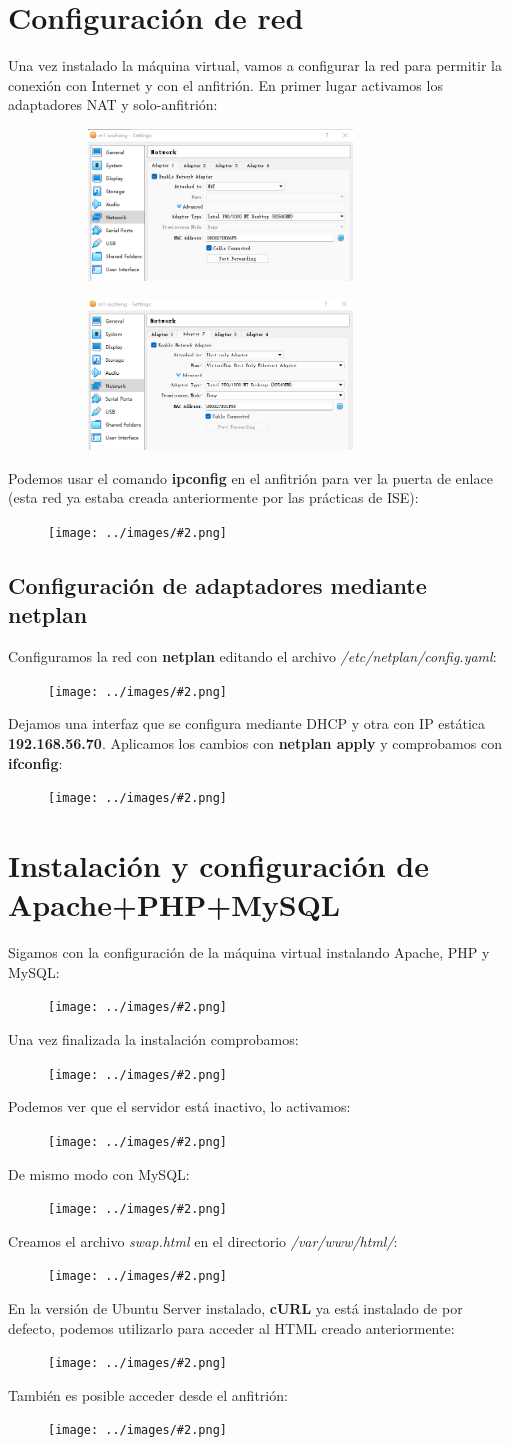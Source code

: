 \documentclass[twoside]{article}
\newcommand{\image}[2]{
\begin{figure}[H]
    \texttt{[image: ../images/\#2.png]}
    \centering
\end{figure}
}
\begin{document}
\section{Configuración de red}
Una vez instalado la máquina virtual, vamos a configurar la red para permitir la conexión con Internet y con el anfitrión. En primer lugar activamos los adaptadores NAT y solo-anfitrión:
\begin{figure}[H]
    \centering
    \begin{subfigure}{.5\textwidth}
        \centering
        \includegraphics[width=7cm]{../images/11.png}
    \end{subfigure}%
    \begin{subfigure}{.5\textwidth}
        \centering
        \includegraphics[width=7cm]{../images/12.png}
    \end{subfigure}
\end{figure}
Podemos usar el comando \textbf{ipconfig} en el anfitrión para ver la puerta de enlace (esta red ya estaba creada anteriormente por las prácticas de ISE):
\image{8}{13}
\subsection{Configuración de adaptadores mediante netplan}
Configuramos la red con \textbf{netplan} editando el archivo \textit{/etc/netplan/config.yaml}:
\image{8}{14}
Dejamos una interfaz que se configura mediante DHCP y otra con IP estática \textbf{192.168.56.70}. Aplicamos los cambios con \textbf{netplan apply} y comprobamos con \textbf{ifconfig}:
\image{8}{15}

\section{Instalación y configuración de Apache+PHP+MySQL}
Sigamos con la configuración de la máquina virtual instalando Apache, PHP y MySQL:
\image{10}{7}
Una vez finalizada la instalación comprobamos:
\image{10}{8}
Podemos ver que el servidor está inactivo, lo activamos:
\image{10}{9}
De mismo modo con MySQL:
\image{10}{10}
Creamos el archivo \textit{swap.html} en el directorio \textit{/var/www/html/}:
\image{8}{16}
En la versión de Ubuntu Server instalado, \textbf{cURL} ya está instalado de por defecto, podemos utilizarlo para acceder al HTML creado anteriormente:
\image{8}{17}
También es posible acceder desde el anfitrión:
\image{10}{18}
\end{document}

